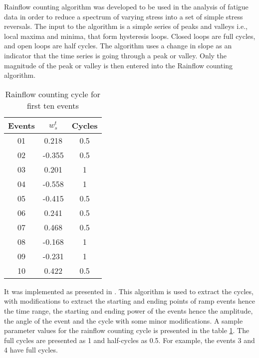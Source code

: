 Rainflow counting algorithm \cite{downing1982simple} was developed to be used in the analysis of fatigue data in order to reduce a spectrum of varying stress into a set of simple stress reversals. The input to the algorithm is a simple series of peaks and valleys i.e., local maxima and minima, that form hysteresis loops. Closed loops are full cycles, and open loops are half cycles. The algorithm uses a change in slope as an indicator that the time series is going through a peak or valley. Only the magnitude of the peak or valley is then entered into the Rainflow counting algorithm.

\begin{table}[!htbp]
\centering
\begin{tabular}{ccc} \hline
Events & $w_s^t$ & Cycles \\ \hline
01	&	0.218	&	0.5\\
02	&	-0.355	&	0.5\\
03	&	0.201	&	1\\
04	&	-0.558	&	1\\
05	&	-0.415	&	0.5\\
06	&	0.241	&	0.5\\
07	&	0.468	&	0.5\\
08	&	-0.168	&	1\\
09	&	-0.231	&	1\\
10	&	0.422	&	0.5\\
\hline
\end{tabular}
\caption{Rainflow counting cycle for first ten events}
\label{tbl:rainflow}
\end{table}

It was implemented as presented in \cite{rinker2014including}. This algorithm is used to extract the cycles, with modifications to extract the starting and ending points of ramp events hence the time range, the starting and ending power of the events hence the amplitude, the angle of the event and the cycle with some minor modifications. A sample parameter values for the rainflow counting cycle is presented in the table \ref{tbl:rainflow}. The full cycles are presented as 1 and half-cycles as 0.5. For example, the events 3 and 4 have full cycles. 